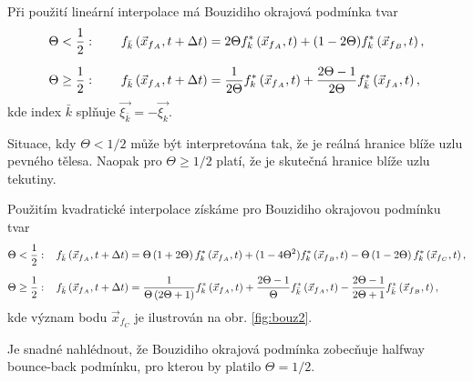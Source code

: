 Při použití lineární interpolace má Bouzidiho okrajová podmínka tvar
\begin{align}\label{eq:lbouz}
\begin{split}
\Theta &< \dfrac{1}{2}: \hspace{7mm} 
f_{\bar{k}}\left(\vec{x}_{f{_A}}, t+\Delta t\right) = 2 \Theta f_{k}^{*}\left(\vec{x}_{f{_A}}, t\right)+(1-2 \Theta) f_{k}^{*}\left(\vec{x}_{f{_B}}, t\right),\\[6pt]
\Theta &\geq \dfrac{1}{2}: \hspace{7mm} f_{\bar{k}}\left(\vec{x}_{f{_A}}, t+\Delta t\right) = \frac{1}{2 \Theta} f_{k}^{*}\left(\vec{x}_{f{_A}}, t\right)+\frac{2 \Theta-1}{2 \Theta} f_{\bar{k}}^{*}\left(\vec{x}_{f{_A}}, t\right),
\end{split}
\end{align}
kde index $ \bar{k} $ splňuje $ \vec{\xi_{\bar{k}}} = -\vec{\xi_{k}}$.

Situace, kdy $ \Theta < 1/2$ může být interpretována tak, že je reálná hranice blíže uzlu pevného tělesa. Naopak pro $ \Theta \geq 1/2$ platí, že je skutečná hranice blíže uzlu tekutiny.

Použitím kvadratické interpolace získáme pro Bouzidiho okrajovou podmínku tvar
\begin{align}\label{eq:qbouz}
\begin{split}
\Theta &< \dfrac{1}{2}: \hspace{3mm} 
f_{\bar{k}}\left(\vec{x}_{f{_A}}, t+\Delta t\right) =
\Theta \left( 1 + 2\Theta \right) f_{k}^{*}\left(\vec{x}_{f{_A}}, t\right)+
(1-4 \Theta^2) f_{k}^{*}\left(\vec{x}_{f{_B}}, t\right)-
\Theta \left( 1 - 2\Theta \right) f_{k}^{*}\left(\vec{x}_{f{_C}}, t\right),\\[6pt]
\Theta &\geq \dfrac{1}{2}: \hspace{3mm}
f_{\bar{k}}\left(\vec{x}_{f{_A}}, t+\Delta t\right) =
\frac{1}{\Theta \left(2 \Theta + 1\right)} f_{k}^{*}\left(\vec{x}_{f{_A}}, t\right) +
\frac{2\Theta - 1}{\Theta} f_{\bar{k}}^{*}\left(\vec{x}_{f{_A}}, t\right) -
\frac{2\Theta - 1}{2 \Theta + 1} f_{\bar{k}}^{*}\left(\vec{x}_{f{_B}}, t\right),
\end{split}
\end{align}
kde význam bodu $ \vec{x}_{f{_C}} $ je ilustrován na obr. \ref{fig:bouz2}.

Je snadné nahlédnout, že Bouzidiho okrajová podmínka zobecňuje halfway bounce-back podmínku, pro kterou by platilo $ \Theta = 1/2$.


